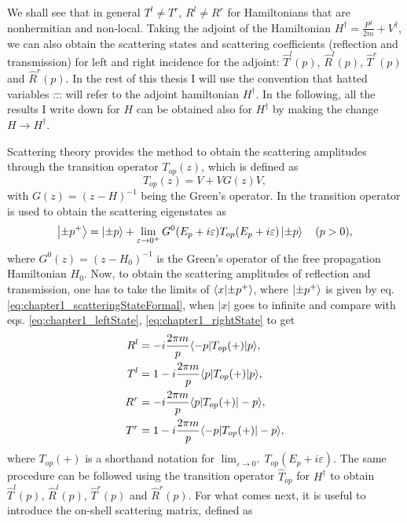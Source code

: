 We shall see that in general $T^l\neq T^r$, $R^l\neq R^r$ for Hamiltonians that are nonhermitian and non-local. Taking the adjoint of the Hamiltonian $H^\dagger = \frac{P^2}{2m} + V^\dagger$, we can also obtain the scattering states and scattering coefficients (reflection and transmission) for left and right incidence for the adjoint: $\widehat{T}^l(p)$, $\widehat{R}^l(p)$, $\widehat{T}^r(p)$ and $\widehat{R}^r(p)$. In the rest of this thesis I will use the convention that hatted variables $\widehat{...}$ will refer to the adjoint hamiltonian $H^\dagger$. In the following, all the results I write down for $H$ can be obtained also for $H^\dagger$ by making the change $H \to H^\dagger$.

Scattering theory provides the method to obtain the scattering amplitudes through the transition operator $T_{op}(z)$, which is defined as
%
\begin{equation}
T_{op}(z) = V + VG(z)V,
\label{eq:chapter1_transitionOperator_definition}
\end{equation}
%
with $G(z) = (z-H)^{-1}$ being the Green's operator. In \cite{Muga2004} the transition operator is used to obtain the scattering eigenstates as
%
\begin{equation}
  \ket{\pm p^+} =  \ket{\pm p} + \lim_{ \varepsilon\to 0^+ } G^0(E_p + i\varepsilon)T_{op}(E_p + i\varepsilon)\ket{\pm p}\quad (p>0),
  \label{eq:chapter1_scatteringStateFormal}
\end{equation}
%
where $G^0(z) = (z-H_0)^{-1}$ is the Green's operator of the free propagation Hamiltonian $H_0$. Now, to obtain the scattering amplitudes of reflection and transmission, one has to take the limits of $\braket{x}{\pm p^+}$, where $\ket{\pm p^+}$ is given by eq. \eqref{eq:chapter1_scatteringStateFormal}, when $|x|$ goes to infinite and compare with eqs. \eqref{eq:chapter1_leftState}, \eqref{eq:chapter1_rightState} to get
%
\begin{align}
R^l&=-i\frac{2\pi m}{p}\la -p|T_{op}(+)|p\ra,
\\
T^l&=1-i\frac{2\pi m}{p} \la p|T_{op}(+)|p\ra,
\label{tl}
\\
R^r&=-i\frac{2\pi m}{p}\la p|T_{op}(+)|-p\ra,
\\
T^r&=1-i\frac{2\pi m}{p}\la -p|T_{op}(+)|-p\ra,
\label{tr}
\end{align}
%
where $T_{op}(+)$ is a shorthand notation for $\lim_{ \varepsilon\to 0^+ } T_{op}(E_p + i\varepsilon)$. The same procedure can be followed using the transition operator $\widehat{T}_{op}$ for $H^\dagger$ to obtain $\widehat{T}^l(p)$, $\widehat{R}^l(p)$, $\widehat{T}^r(p)$ and $\widehat{R}^r(p)$. For what comes next, it is useful to introduce the on-shell scattering matrix, defined as
